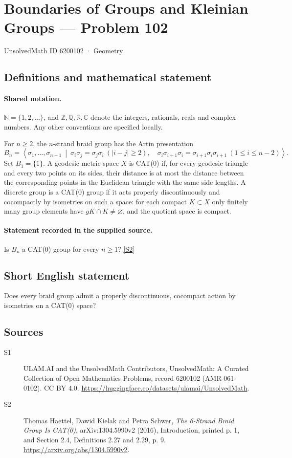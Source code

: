 \documentclass[11pt]{article}
\newcommand{\sref}[2]{\hyperlink{source:#1:#2}{[S#2]}}
\begin{document}
\setcounter{section}{6200101}
\section{Boundaries of Groups and Kleinian Groups — Problem 102}\label{6200102}
{\small\sffamily UnsolvedMath ID 6200102 · Geometry}
\subsection{Definitions and mathematical statement}

\paragraph{Shared notation.}$\mathbb N=\{1,2,\ldots\}$, and $\mathbb Z,\mathbb Q,\mathbb R,\mathbb C$ denote the integers, rationals, reals and complex numbers. Any other conventions are specified locally.


For $n\ge2$, the $n$-strand braid group has the Artin presentation
\[B_n=\left\langle \sigma_1,\ldots,\sigma_{n-1}\ \middle|\ \sigma_i\sigma_j=\sigma_j\sigma_i\ (|i-j|\ge2),\quad \sigma_i\sigma_{i+1}\sigma_i=\sigma_{i+1}\sigma_i\sigma_{i+1}\ (1\le i\le n-2)\right\rangle.\]
Set $B_1=\{1\}$. A geodesic metric space $X$ is CAT(0) if, for every geodesic triangle and every two points on its sides, their distance is at most the distance between the corresponding points in the Euclidean triangle with the same side lengths. A discrete group is a CAT(0) group if it acts properly discontinuously and cocompactly by isometries on such a space: for each compact $K\subset X$ only finitely many group elements have $gK\cap K\ne\varnothing$, and the quotient space is compact.
\paragraph{Statement recorded in the supplied source.}
Is $B_n$ a CAT(0) group for every $n\ge1$? \sref{6200102}{2}
\subsection{Short English statement}
Does every braid group admit a properly discontinuous, cocompact action by isometries on a CAT(0) space?
\subsection{Sources}
\begin{description}
\item[\hypertarget{source:6200102:1}{S1}] ULAM.AI and the UnsolvedMath Contributors, UnsolvedMath: A Curated Collection of Open Mathematics Problems, record 6200102 (AMR-061-0102). CC BY 4.0. \url{https://huggingface.co/datasets/ulamai/UnsolvedMath}.
\item[\hypertarget{source:6200102:2}{S2}] Thomas Haettel, Dawid Kielak and Petra Schwer, \emph{The 6-Strand Braid Group Is CAT(0)}, arXiv:1304.5990v2 (2016), Introduction, printed p. 1, and Section 2.4, Definitions 2.27 and 2.29, p. 9. \url{https://arxiv.org/abs/1304.5990v2}.
\end{description}
\label{end:6200102}
\end{document}
